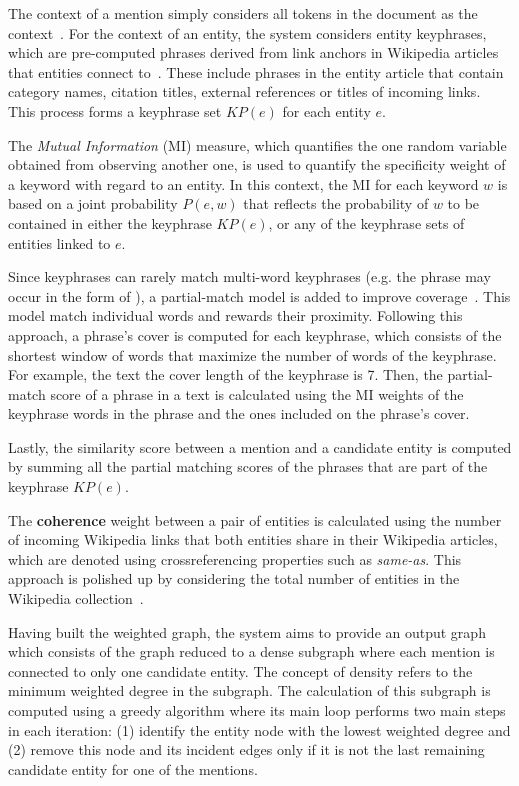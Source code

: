 The context of a mention simply considers all tokens in the document as the 
context~\cite{infExtr:ThaterFP10}. For the context of an entity, the system considers entity 
keyphrases, which are pre-computed phrases derived from link anchors in Wikipedia articles that 
entities connect to~\cite{infExtr:ThaterFP10}. These include phrases in the entity article that 
contain category names, citation titles, external references or titles of incoming links. This 
process forms a keyphrase set $KP(e)$ for each entity $e$. 

The \textit{Mutual Information} (MI) measure, which quantifies the  
one random variable obtained from observing another one, is used to quantify the specificity weight 
of a keyword with regard to an entity. In this context, the MI for each keyword $w$ is based on 
a joint probability $P(e, w)$ that reflects the probability of $w$ to be contained in either the 
keyphrase $KP(e)$, or any of the keyphrase sets of entities linked to $e$. 

Since keyphrases can rarely match multi-word keyphrases (e.g. the phrase  may occur in the form of ), a partial-match model is added to 
improve coverage~\cite{infExtr:taneva2011}. This model match individual words and rewards their
proximity. Following this approach, a phrase's cover is computed for each keyphrase, which 
consists of the shortest window of words that maximize the number of words of the keyphrase. 
For example, the text  the cover length of the 
keyphrase  is 7. Then, the partial-match score of a phrase in a text 
is calculated using the MI weights of the keyphrase words in the phrase and the ones
included on the phrase's cover.

Lastly, the similarity score between a mention and a candidate entity is computed by summing all 
the partial matching scores of the phrases that are part of the keyphrase $KP(e)$.

The \textbf{coherence} weight between a pair of entities is calculated using the number of 
incoming Wikipedia links that both entities share in their Wikipedia articles, which are denoted 
using crossreferencing properties such as \textit{same-as}. This approach is polished up by 
considering the total number of entities in the Wikipedia collection~\cite{infExtr:MilneW08}.

Having built the weighted graph, the system aims to provide an output graph which consists of 
the graph reduced to a dense subgraph where each mention is connected to only one candidate 
entity. The concept of density refers to the minimum weighted degree in the subgraph. The 
calculation of this subgraph is computed using a greedy algorithm where its main loop performs 
two main steps in each iteration: (1) identify the entity node with the lowest weighted degree 
and (2) remove this node and its incident edges only if it is not the last remaining candidate 
entity for one of the mentions. 

